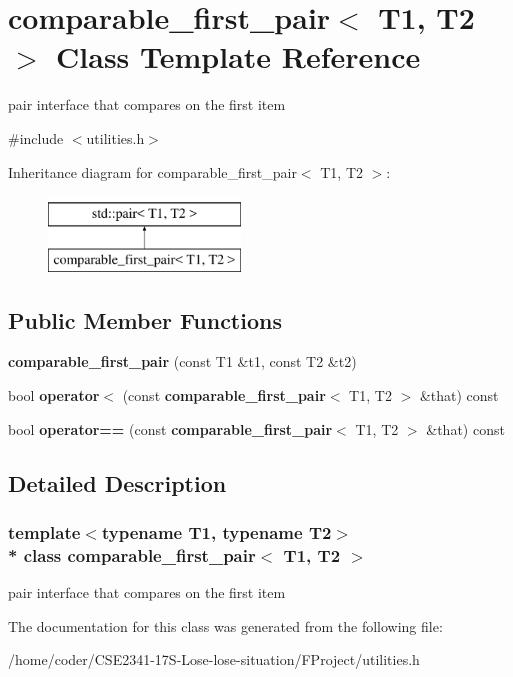 \section{comparable\+\_\+first\+\_\+pair$<$ T1, T2 $>$ Class Template Reference}
\label{classcomparable__first__pair}


pair interface that compares on the first item  




{\ttfamily \#include $<$utilities.\+h$>$}

Inheritance diagram for comparable\+\_\+first\+\_\+pair$<$ T1, T2 $>$\+:\begin{figure}[H]
\begin{center}
\leavevmode
\includegraphics[height=2.000000cm]{classcomparable__first__pair}
\end{center}
\end{figure}
\subsection*{Public Member Functions}
\begin{DoxyCompactItemize}
\item 
{\bfseries comparable\+\_\+first\+\_\+pair} (const T1 \&t1, const T2 \&t2)
\item 
bool {\bfseries operator$<$} (const {\bf comparable\+\_\+first\+\_\+pair}$<$ T1, T2 $>$ \&that) const 
\item 
bool {\bfseries operator==} (const {\bf comparable\+\_\+first\+\_\+pair}$<$ T1, T2 $>$ \&that) const 
\end{DoxyCompactItemize}


\subsection{Detailed Description}
\subsubsection*{template$<$typename T1, typename T2$>$\\*
class comparable\+\_\+first\+\_\+pair$<$ T1, T2 $>$}

pair interface that compares on the first item 

The documentation for this class was generated from the following file\+:\begin{DoxyCompactItemize}
\item 
/home/coder/\+C\+S\+E2341-\/17\+S-\/\+Lose-\/lose-\/situation/\+F\+Project/utilities.\+h\end{DoxyCompactItemize}
